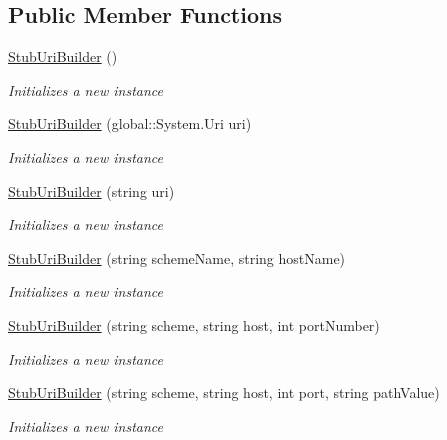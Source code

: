\subsection*{Public Member Functions}
\begin{DoxyCompactItemize}
\item 
\hyperlink{class_system_1_1_fakes_1_1_stub_uri_builder_aa208a3ea038ef190c89d1358dd8a141b}{Stub\-Uri\-Builder} ()
\begin{DoxyCompactList}\small\item\em Initializes a new instance\end{DoxyCompactList}\item 
\hyperlink{class_system_1_1_fakes_1_1_stub_uri_builder_a25e6bd5407ccc9441a3e1ede2dc9b319}{Stub\-Uri\-Builder} (global\-::\-System.\-Uri uri)
\begin{DoxyCompactList}\small\item\em Initializes a new instance\end{DoxyCompactList}\item 
\hyperlink{class_system_1_1_fakes_1_1_stub_uri_builder_aded7e5135dd72576e9f9593fed2b532b}{Stub\-Uri\-Builder} (string uri)
\begin{DoxyCompactList}\small\item\em Initializes a new instance\end{DoxyCompactList}\item 
\hyperlink{class_system_1_1_fakes_1_1_stub_uri_builder_a4d90fd1eda698aaccdb75b9575fc95f2}{Stub\-Uri\-Builder} (string scheme\-Name, string host\-Name)
\begin{DoxyCompactList}\small\item\em Initializes a new instance\end{DoxyCompactList}\item 
\hyperlink{class_system_1_1_fakes_1_1_stub_uri_builder_afac0ebf17af03c5257728a5eacf35dc8}{Stub\-Uri\-Builder} (string scheme, string host, int port\-Number)
\begin{DoxyCompactList}\small\item\em Initializes a new instance\end{DoxyCompactList}\item 
\hyperlink{class_system_1_1_fakes_1_1_stub_uri_builder_ad32965fa4fdf2ea6716e2f6bcfc1d04b}{Stub\-Uri\-Builder} (string scheme, string host, int port, string path\-Value)
\begin{DoxyCompactList}\small\item\em Initializes a new instance\end{DoxyCompactList}\item 

\end{DoxyCompactItemize}
